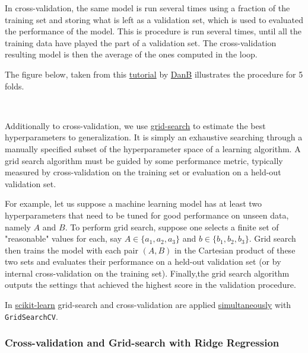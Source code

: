 \documentclass[11pt]{article}
\begin{document}
{In cross-validation, the same model is run several times using a
fraction of the training set and storing what is left as a validation
set, which is used to evaluated the performance of the model. This is
procedure is run several times, until all the training data have played
the part of a validation set. The cross-validation resulting model is
then the average of the ones computed in the loop.

The figure below, taken from this
\href{https://www.kaggle.com/dansbecker/cross-validation/code}{tutorial}
by \href{https://www.kaggle.com/dansbecker}{DanB} illustrates the
procedure for 5 folds.
    
    \begin{center}
    \end{center}
    { \hspace*{\fill} \\}
    

    Additionally to cross-validation, we use
\href{https://en.wikipedia.org/wiki/Hyperparameter_optimization}{grid-search}
to estimate the best hyperparameters to generalization. It is simply an
exhaustive searching through a manually specified subset of the
hyperparameter space of a learning algorithm. A grid search algorithm
must be guided by some performance metric, typically measured by
cross-validation on the training set or evaluation on a held-out
validation set.

For example, let us suppose a machine learning model has at least two
hyperparameters that need to be tuned for good performance on unseen
data, namely $A$ and $B$. To perform grid search, suppose one
selects a finite set of "reasonable" values for each, say $A \in \{
a_1 , a_2 , a_3 \} $ and $ b \in \{ b_1 , b_2 , b_3 \} $. Grid
search then trains the model with each pair $ (A,B) $ in the Cartesian
product of these two sets and evaluates their performance on a held-out
validation set (or by internal cross-validation on the training set).
Finally,the grid search algorithm outputs the settings that achieved the
highest score in the validation procedure.

In \href{http://scikit-learn.org/stable/index.html}{scikit-learn}
grid-search and cross-validation are applied
\href{http://scikit-learn.org/stable/modules/generated/sklearn.model_selection.GridSearchCV.html}{simultaneously}
with \texttt{GridSearchCV}.

    \subsubsection{Cross-validation and Grid-search with Ridge
Regression}\label{cross-validation-and-grid-search-with-ridge-regression}

}
\end{document}
